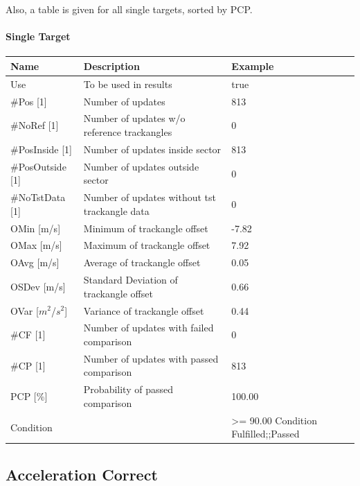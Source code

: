 Also, a table is given for all single targets, sorted by PCP.

\paragraph{Single Target}

\begin{center}
 \begin{table}[H]
  \begin{tabularx}{\textwidth}{ | l | X |  l | }
    \hline
    \textbf{Name} & \textbf{Description} & \textbf{Example} \\ \hline
    Use & To be used in results & true \\ \hline
    \#Pos [1] & Number of updates & 813 \\ \hline
    \#NoRef [1] & Number of updates w/o reference trackangles & 0 \\ \hline
    \#PosInside [1] & Number of updates inside sector & 813 \\ \hline
    \#PosOutside [1] & Number of updates outside sector & 0 \\ \hline
    \#NoTstData [1] & Number of updates without tst trackangle data & 0 \\ \hline
    OMin [m/s] & Minimum of trackangle offset & -7.82 \\ \hline
    OMax [m/s] & Maximum of trackangle offset & 7.92 \\ \hline
    OAvg [m/s] & Average of trackangle offset & 0.05 \\ \hline
    OSDev [m/s] & Standard Deviation of trackangle offset & 0.66 \\ \hline
    OVar [$m^2$/$s^2$] & Variance of trackangle offset & 0.44 \\ \hline
    \#CF [1] & Number of updates with failed comparison & 0 \\ \hline
    \#CP [1] & Number of updates with passed comparison & 813 \\ \hline
    PCP [\%] & Probability of passed comparison & 100.00 \\ \hline
    Condition &  & >= 90.00
    Condition Fulfilled;;Passed
\end{tabularx}
\end{table}
\end{center}


\subsection{Acceleration Correct}
\label{sec:eval_req_accel_correct} 


